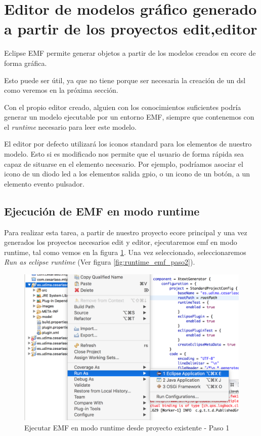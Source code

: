 \section{Editor de modelos gráfico generado a partir de los proyectos edit,editor}

Eclipse EMF permite generar objetos a partir de los modelos creados en \gls{ecore} de forma gráfica. 

Esto puede ser útil, ya que no tiene porque ser necesaria la creación de un \gls{dsl} como veremos en la próxima sección. 

Con el propio editor creado, alguien con los conocimientos suficientes podría generar un modelo ejecutable por un entorno EMF, siempre que contenemos con el \textit{runtime} necesario para leer este modelo.

El editor por defecto utilizará los iconos standard para los elementos de nuestro modelo. Esto si es modificado nos permite que el usuario de forma rápida sea capaz de situarse en el elemento necesario. Por ejemplo, podríamos asociar el icono de un diodo \gls{led} a los elementos salida \gls{gpio}, o un icono de un botón, a un elemento evento pulsador.


\subsection{Ejecución de EMF en modo runtime}

Para realizar esta tarea, a partir de nuestro proyecto \gls{ecore} principal y una vez generados los proyectos necesarios edit y editor, ejecutaremos \gls{emf} en modo \gls{runtime}, tal como vemos en la figura \ref{fig:runtime_emf_paso1}. Una vez seleccionado, seleccionaremos \textit{Run as eclipse runtime}  (Ver figura \ref{fig:runtime_emf_paso2}).

\begin{figure}
	\centering
    \includegraphics[scale=0.4]{images/emf_capturas/runtime_emf_paso1}
    \sourcepropia{}
    \caption{Ejecutar EMF en modo runtime desde proyecto existente - Paso 1}
    \label{fig:runtime_emf_paso1}
\end{figure}

